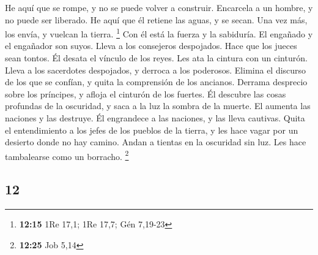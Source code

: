 \begin{paracol}{2}
 He aquí que se rompe, y no se puede volver a construir.
Encarcela a un hombre, y no puede ser liberado.  He aquí
que él retiene las aguas, y se secan. Una vez más, los envía, y vuelcan
la tierra. \footnote{\textbf{12:15} 1Re 17,1; 1Re 17,7; Gén 7,19-23}
 Con él está la fuerza y la sabiduría. El engañado y el
engañador son suyos.  Lleva a los consejeros despojados.
Hace que los jueces sean tontos.  Él desata el vínculo de
los reyes. Les ata la cintura con un cinturón.  Lleva a
los sacerdotes despojados, y derroca a los poderosos. 
Elimina el discurso de los que se confían, y quita la comprensión de los
ancianos.  Derrama desprecio sobre los príncipes, y
afloja el cinturón de los fuertes.  Él descubre las cosas
profundas de la oscuridad, y saca a la luz la sombra de la muerte.
 El aumenta las naciones y las destruye. Él engrandece a
las naciones, y las lleva cautivas.  Quita el
entendimiento a los jefes de los pueblos de la tierra, y les hace vagar
por un desierto donde no hay camino.  Andan a tientas en
la oscuridad sin luz. Les hace tambalearse como un borracho. \footnote{\textbf{12:25}
  Job 5,14}

\switchcolumn
\begin{otherlanguage}{english}

\hypertarget{section-23}{%
\section{12}\label{section-23}}


\end{otherlanguage}
\end{paracol}
